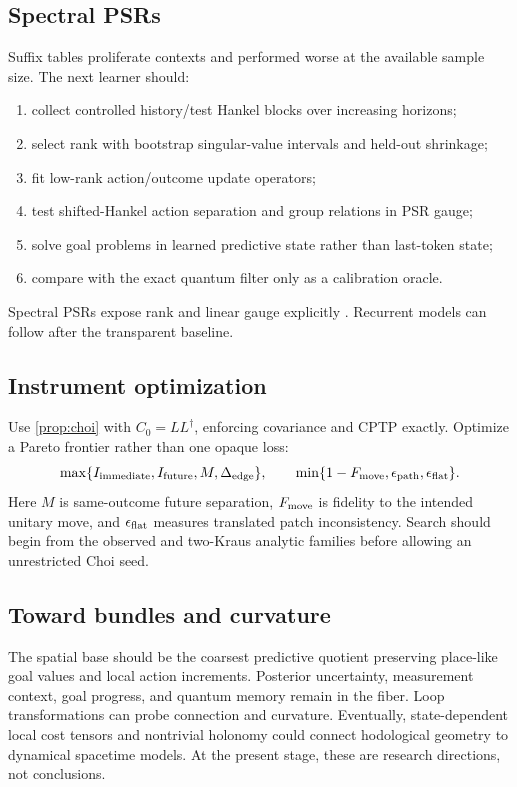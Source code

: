 \documentclass[11pt]{article}
\theoremstyle{definition}
\theoremstyle{remark}
\begin{document}
\subsection{Spectral PSRs}

Suffix tables proliferate contexts and performed worse at the available
sample size. The next learner should:
\begin{enumerate}
\item collect controlled history/test Hankel blocks over increasing horizons;
\item select rank with bootstrap singular-value intervals and held-out
shrinkage;
\item fit low-rank action/outcome update operators;
\item test shifted-Hankel action separation and group relations in PSR gauge;
\item solve goal problems in learned predictive state rather than last-token
state;
\item compare with the exact quantum filter only as a calibration oracle.
\end{enumerate}
Spectral PSRs expose rank and linear gauge explicitly
\cite{Littman2001,Hsu2012}. Recurrent models can follow after the transparent
baseline.

\subsection{Instrument optimization}

Use \cref{prop:choi} with \(C_0=LL^\dagger\), enforcing covariance and CPTP
exactly. Optimize a Pareto frontier rather than one opaque loss:
\[
\max\{I_{\rm immediate},I_{\rm future},M,\Delta_{\rm edge}\},\qquad
\min\{1-F_{\rm move},\epsilon_{\rm path},\epsilon_{\rm flat}\}.
\]
Here \(M\) is same-outcome future separation, \(F_{\rm move}\) is fidelity to
the intended unitary move, and \(\epsilon_{\rm flat}\) measures translated
patch inconsistency. Search should begin from the observed and two-Kraus
analytic families before allowing an unrestricted Choi seed.

\subsection{Toward bundles and curvature}

The spatial base should be the coarsest predictive quotient preserving
place-like goal values and local action increments. Posterior uncertainty,
measurement context, goal progress, and quantum memory remain in the fiber.
Loop transformations can probe connection and curvature. Eventually,
state-dependent local cost tensors and nontrivial holonomy could connect
hodological geometry to dynamical spacetime models. At the present stage,
these are research directions, not conclusions.
\end{document}
